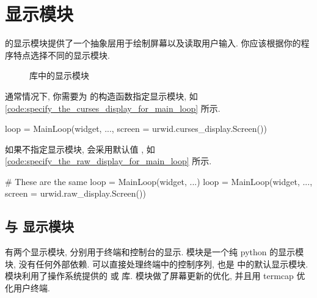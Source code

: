 \section{显示模块}
\indent\urwid{} 的显示模块提供了一个抽象层用于绘制屏幕以及读取用户输入. 你应该根据你的程序特点选择不同的显示模块.

\begin{figure}[!htb]
    \centering
    
    \caption{\urwid{} 库中的显示模块}
    \label{fig:display_models_of_urwid_library}
\end{figure}

通常情况下, 你需要为  的构造函数指定显示模块, 如\cref{code:specify_the_curses_display_for_main_loop} 所示.%
%
\begin{codebox}[
  caption = 为 \inlinepython{MainLoop} 指定显示模块 \inlinepython{urwid.curses_display.Screen()},
  label = code:specify_the_curses_display_for_main_loop
]
loop = MainLoop(widget, ..., screen = urwid.curses_display.Screen())
\end{codebox}%
%
如果不指定显示模块,  会采用默认值 , 如\cref{code:specify_the_raw_display_for_main_loop} 所示.%
%
\begin{codebox}[
  caption = 为 \inlinepython{MainLoop} 指定显示模块 \inlinepython{urwid.raw_display.Screen()},
  label = code:specify_the_raw_display_for_main_loop
]
# These are the same
loop = MainLoop(widget, ...)
loop = MainLoop(widget, ..., screen = urwid.raw_display.Screen())
\end{codebox}%

\subsection[raw\_display 与 curses\_display 显示模块]{ 与  显示模块}
\indent\urwid{} 有两个显示模块, 分别用于终端和控制台的显示.  模块是一个纯 python 的显示模块, 没有任何外部依赖.  可以直接处理终端中的控制序列, 也是  中的默认显示模块.  模块利用了操作系统提供的  或  库.  模块做了屏幕更新的优化, 并且用 termcap 优化用户终端.

